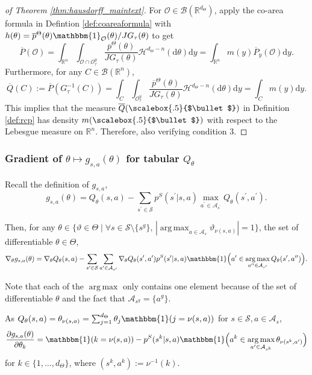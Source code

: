 \documentclass{amsart}
\renewcommand{\cdot}[1][.5]{%
  \mathbin{\vcenter{\hbox{\scalebox{#1}{$\bullet$}}}}%
}
\DeclareMathOperator*{\argmax}{arg\,max}
\begin{document}
\begin{proof}[of Theorem \ref{thm:hausdorff_maintext}]
For $\mathcal{O} \in \mathcal{B}(\mathbb{R}^{d_\Theta})$, apply the co-area formula in Defintion \ref{def:coareaformula}  with $h(\theta)=\overline{p}^{\Theta}(\theta) \mathbbm{1}_{\mathcal{O}}(\theta)/J G_{\tau}(\theta)$ to get
$$\overline{P}(\mathcal{O})=\int_{\mathbb{R}^n}  \int_{\mathcal{O} \cap \mathcal{O}^y_\tau} \frac{\overline{p}^\Theta(\theta)}{JG_\tau(\theta)}\mathcal{H}^{d_\Theta-n}(\mathrm{d}\theta) \mathrm{d}y=\int_{\mathbb{R}^n} m(y) \overline{P}_y(\mathcal{O}) \mathrm{d}y.$$
Furthermore, for any $C \in \mathcal{B}(\mathbb{R}^n)$, 
$$\overline{Q}(C):=\overline{P}(G_\tau^{-1}(C))=\int_C \int_{\mathcal{O}^y_\tau } \frac{\overline{p}^\Theta(\theta)}{JG_\tau(\theta)}\mathcal{H}^{d_\Theta-n}(\mathrm{d}\theta)\mathrm{d}y= \int_C m(y)\mathrm{d}y.$$ This implies that
the measure $\overline{Q}(\cdot)$ in Definition \ref{def:rcp} has density $m(\cdot)$ with respect to the Lebesgue measure on $\mathbb{R}^n$. Therefore, also verifying condition 3.

\end{proof}

\subsubsection{Gradient of \texorpdfstring{$\theta \mapsto g_{s,a}(\theta)$}{g} for tabular \texorpdfstring{$Q_\theta$}{Qθ}}
\label{apd:gradq}

Recall the definition of $g_{s,a}$, 
     $$g_{s,a}(\theta) = Q_\theta(s,a)
     -\sum_{s^\prime \in \mathcal{S}} p^S(s^\prime|s,a)
     \max_{a^\prime \in \mathcal{A}_{s^\prime}}Q_\theta(s^\prime, a^\prime).$$

Then, for any $\theta \in \{\vartheta \in \Theta \mid \forall s \in \mathcal{S} \setminus \{s^g\}, \,|\argmax_{a \in \mathcal{A}_s} \vartheta_{\nu(s,a)}|=1\}$, the set of differentiable $\theta \in \Theta$, 
 $$
 \nabla_\theta g_{s,a}(\theta) =  \nabla_\theta Q_\theta(s,a) - \sum_{s^\prime \in \mathcal{S}} \sum_{a^\prime \in \mathcal{A}_{s^\prime}}  \nabla_\theta Q_\theta(s^\prime, a^\prime) p^S(s^\prime|s,a) \mathbbm{1}\Big(a^\prime \in \argmax_{a^{\prime\prime} \in \mathcal{A}_{s^\prime}}Q_\theta(s^\prime,a^{\prime\prime})\Big).
 $$

 
 Note that each of the $\argmax$ only contains one element because of the set of differentiable $\theta$ and the fact that $\mathcal{A}_{s^g}=\{a^g\}$.

As $Q_\theta(s,a) = \theta_{\nu(s,a)} = \sum_{j=1}^{d_{\Theta}} \theta_{j}\mathbbm{1}(j=\nu(s,a))$ for $s\in \mathcal{S}, a \in \mathcal{A}_s$,
 $$
 \frac{\partial g_{s,a}(\theta)}{\partial \theta_k} = \mathbbm{1}(k=\nu(s,a)) - p^S(s^k|s,a) \mathbbm{1}\Big(a^k \in \argmax_{a^{\prime} \in \mathcal{A}_{s^k}}\theta_{\nu(s^k,a^{\prime})}\Big)
 $$
 for $k \in \{1,\dots,d_{\Theta}\}$, where $(s^k,a^k):= \nu^{-1}(k)$.
\end{document}
